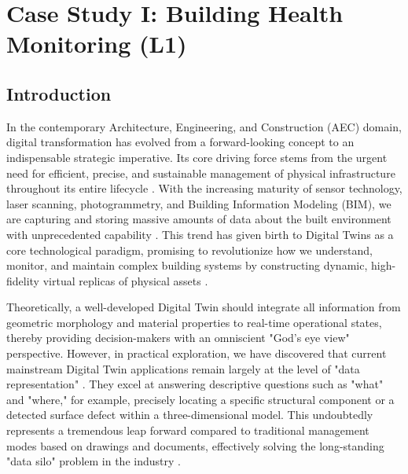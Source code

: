 
\chapter{Case Study I: Building Health Monitoring (L1)} \label{chp:building}

\section{Introduction}

In the contemporary Architecture, Engineering, and Construction (AEC) domain, digital transformation has evolved from a forward-looking concept to an indispensable strategic imperative. Its core driving force stems from the urgent need for efficient, precise, and sustainable management of physical infrastructure throughout its entire lifecycle \cite{boje2020towards, lu2020digital}. With the increasing maturity of sensor technology, laser scanning, photogrammetry, and Building Information Modeling (BIM), we are capturing and storing massive amounts of data about the built environment with unprecedented capability \cite{tang2019retrieving, li2024single}. This trend has given birth to Digital Twins as a core technological paradigm, promising to revolutionize how we understand, monitor, and maintain complex building systems by constructing dynamic, high-fidelity virtual replicas of physical assets \cite{tao2018digital}.

Theoretically, a well-developed Digital Twin should integrate all information from geometric morphology and material properties to real-time operational states, thereby providing decision-makers with an omniscient "God's eye view" perspective. However, in practical exploration, we have discovered that current mainstream Digital Twin applications remain largely at the level of "data representation" \cite{negri2017review}. They excel at answering descriptive questions such as "what" and "where," for example, precisely locating a specific structural component or a detected surface defect within a three-dimensional model. This undoubtedly represents a tremendous leap forward compared to traditional management modes based on drawings and documents, effectively solving the long-standing "data silo" problem in the industry \cite{bruno2018historic}.

